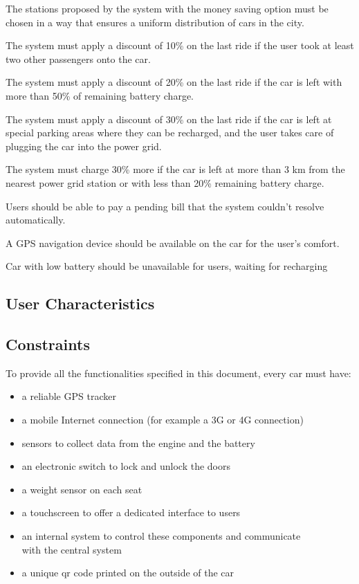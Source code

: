 \documentclass[english]{article}
\begin{document}
\begin{description}
	\item[{[G13]}]{The stations proposed by the system with the money saving option must be chosen in a way that ensures a uniform distribution of cars in the city.}
	\item[{[G14]}]{The system must apply a discount of 10\% on the last ride if the user took at least two other passengers onto the car.}
	\item[{[G15]}]{The system must apply a discount of 20\% on the last ride if the car is left with more than 50\% of remaining battery charge.}
	\item[{[G16]}]{The system must apply a discount of 30\% on the last ride if the car is left at special parking areas where they can be recharged, and the user takes care of plugging the car into the power grid.}
	\item[{[G17]}]{The system must charge 30\% more if the car is left at more than 3 km from the nearest power grid station or with less than 20\% remaining battery charge.}
	\item[{[G18]}]{Users should be able to pay a pending bill that the system couldn’t resolve automatically.}
	\item{A GPS navigation device should be available on the car for the user's comfort.}
	\item{Car with low battery should be unavailable for users, waiting for recharging}
\end{description}

\subsection{User Characteristics}

\subsection{Constraints}

To provide all the functionalities specified in this document, every car must have:
\begin{itemize}
	\item{a reliable GPS tracker}
	\item{a mobile Internet connection (for example a 3G or 4G connection)}
	\item{sensors to collect data from the engine and the battery}
	\item{an electronic switch to lock and unlock the doors}
	\item{a weight sensor on each seat}
	\item{a touchscreen to offer a dedicated interface to users}
	\item{an internal system to control these components and communicate\\ with the central system}
	\item{a unique qr code printed on the outside of the car}
\end{itemize}
\end{document}
